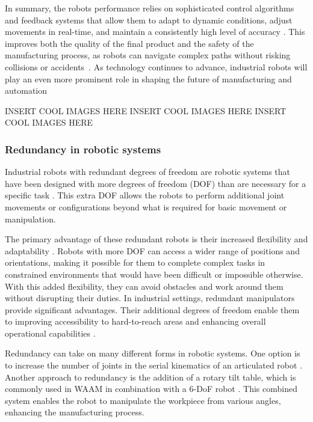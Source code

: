 In summary, the robots performance relies on sophisticated control algorithms and feedback systems that allow them to adapt to dynamic conditions, adjust movements in real-time, and maintain a consistently high level of accuracy \cite{Lin.2023}. This improves both the quality of the final product and the safety of the manufacturing process, as robots can navigate complex paths without risking collisions or accidents~\cite{Bosscher.2011}.
As technology continues to advance, industrial robots will play an even more prominent role in shaping the future of manufacturing and automation \cite{Domae.2019}

INSERT COOL IMAGES HERE\newline
INSERT COOL IMAGES HERE\newline
INSERT COOL IMAGES HERE\newline


\subsubsection{Redundancy in robotic systems}

Industrial robots with redundant degrees of freedom are robotic systems that have been designed with more degrees of freedom (DOF) than are necessary for a specific task \cite{Liu.2022}. This extra DOF allows the robots to perform additional joint movements or configurations beyond what is required for basic movement or manipulation.

The primary advantage of these redundant robots is their increased flexibility and adaptability \cite{Duong.2021}. Robots with more DOF can access a wider range of positions and orientations, making it possible for them to complete complex tasks in constrained environments that would have been difficult or impossible otherwise. With this added flexibility, they can avoid obstacles and work around them without disrupting their duties. In industrial settings, redundant manipulators provide significant advantages. Their additional degrees of freedom enable them to improving accessibility to hard-to-reach areas and enhancing overall operational capabilities \cite{Shi.2021}.   

Redundancy can take on many different forms in robotic systems. One option is to increase the number of joints in the serial kinematics of an articulated robot \cite{Milenkovic.2021}. Another approach to redundancy is the addition of a rotary tilt table, which is commonly used in WAAM in combination with a 6-DoF robot \cite{Yuan.2020}. This combined system enables the robot to manipulate the workpiece from various angles, enhancing the manufacturing process.

